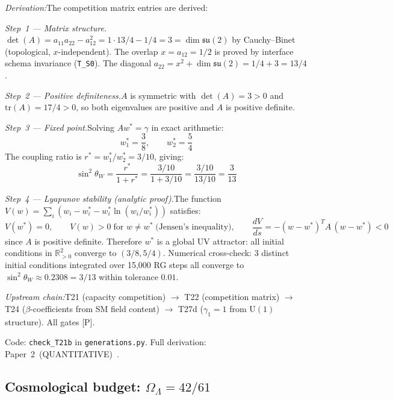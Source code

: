 \documentclass[11pt]{article}
\newcommand{\sw}{\sin^2\!\theta_W}
\newcommand{\tr}{\mathrm{tr}}
\newcommand{\U}{\mathrm{U}}
\begin{document}
\textit{Derivation:}\quad The competition matrix entries are derived:

\textit{Step~1 --- Matrix structure.}\quad $\det(A) = a_{11}a_{22} - a_{12}^2 = 1 \cdot 13/4 - 1/4 = 3 = \dim\mathfrak{su}(2)$ by Cauchy--Binet (topological, $x$-independent).  The overlap $x = a_{12} = 1/2$ is proved by interface schema invariance (\texttt{T\_S0}).  The diagonal $a_{22} = x^2 + \dim\mathfrak{su}(2) = 1/4 + 3 = 13/4$.

\textit{Step~2 --- Positive definiteness.}\quad $A$ is symmetric with $\det(A) = 3 > 0$ and $\tr(A) = 17/4 > 0$, so both eigenvalues are positive and $A$ is positive definite.

\textit{Step~3 --- Fixed point.}\quad Solving $Aw^* = \gamma$ in exact arithmetic:
\begin{equation}
w_1^* = \frac{3}{8}, \qquad w_2^* = \frac{5}{4}
\end{equation}
The coupling ratio is $r^* = w_1^*/w_2^* = 3/10$, giving:
\begin{equation}
\sw = \frac{r^*}{1 + r^*} = \frac{3/10}{1 + 3/10} = \frac{3/10}{13/10} = \frac{3}{13}
\end{equation}

\textit{Step~4 --- Lyapunov stability (analytic proof).}\quad The function $V(w) = \sum_i (w_i - w_i^* - w_i^* \ln(w_i/w_i^*))$ satisfies:
\begin{equation}
V(w^*) = 0, \qquad V(w) > 0 \;\text{for } w \ne w^* \;\text{(Jensen's inequality)}, \qquad \frac{dV}{ds} = -(w - w^*)^T A\,(w - w^*) < 0
\end{equation}
since $A$ is positive definite.  Therefore $w^*$ is a global UV attractor: all initial conditions in $\mathbb{R}^2_{>0}$ converge to $(3/8, 5/4)$.  Numerical cross-check: 3 distinct initial conditions integrated over 15,000 RG steps all converge to $\sw \approx 0.2308 = 3/13$ within tolerance $0.01$.

\textit{Upstream chain:}\quad T21 (capacity competition) $\to$ T22 (competition matrix) $\to$ T24 ($\beta$-coefficients from SM field content) $\to$ T27d ($\gamma_1 = 1$ from $\U(1)$ structure).  All gates [P].

Code: \texttt{check\_T21b} in \texttt{generations.py}.  Full derivation: Paper~2~(QUANTITATIVE)~\cite{P2Q}.


\subsection{Cosmological budget: \texorpdfstring{$\Omega_\Lambda = 42/61$}{ΩΛ = 42/61}}
\end{document}
